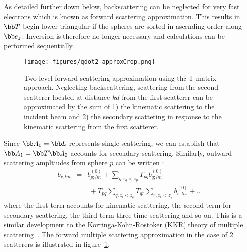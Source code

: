 As detailed further down below, backscattering can be neglected for very
fast electrons which is known as forward scattering approximation. This results
in $\bb T$ begin lower triangular if the spheres are sorted in ascending
order along $\bb e_z$. Inversion is therefore no longer necessary and
calculations can be performed sequentially.

\begin{figure}
  \centering
  \texttt{[image: figures/qdot2\_approxCrop.png]}
\caption{Two-level forward scattering approximation using the T-matrix approach.
Neglecting backscattering, scattering from the second scatterer located at
distance $kd$ from the first scatterer can be approximated by the sum of
1) the kinematic scattering to the incident beam and
2) the secondary scattering in response to the kinematic scattering from
the first scatterer. }\label{fig:qdot2_approx}
\end{figure}


Since $\bb A_0=\bb L$ represents single scattering, we can establish that
$\bb A_1=\bb T\bb A_0$ accounts for secondary scattering.
Similarly, outward scattering ampltiudes from sphere $p$ can be written :
%
\begin{eqnarray}
  b_{p;lm} &=&
      b_{p;lm}^{(0)} + \sum_{q,z_q<z_p}T_{pq}b_{q;lm}^{(0)}  \label{eq:multiple_scattering}\\
    &&~+T_{pq}\sum_{q,z_q<z_p}T_{qr}\sum_{r,z_r<z_q}b_{r;lm}^{(0)} + ..\nonumber
\end{eqnarray}
%
where the first term accounts for kinematic scattering, the second term for
secondary scattering, the third term three time scattering and so on.
This is a similar development to the Korringa-Kohn-Rostoker (KKR) theory of
multiple scattering~\cite{Korringa1947,Kohn1954,Korringa1994}.
The forward multiple scattering approximation in the case of 2 scatterers
is illustrated in figure~\ref{fig:qdot2_approx}.


